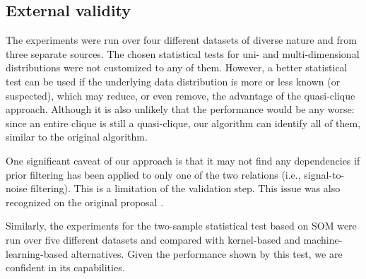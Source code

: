 \subsection{External validity}
The \PresQ experiments were run over four different datasets of
diverse nature and from three separate sources. The chosen statistical tests for
uni- and multi-dimensional distributions were not customized to any of them.
However, a better statistical test can be used if the underlying data distribution is more or
less known (or suspected), which may reduce, or even remove, the advantage of the
quasi-clique approach. Although it is also unlikely that the performance would be any worse:
since an entire clique is still a quasi-clique, our algorithm can identify all of them,
similar to the original \Find algorithm.

One significant caveat of our approach is that it may not find
any dependencies if prior filtering has been applied to only one of the two relations
(i.e., signal-to-noise filtering). This is a limitation of the validation
step. This issue was also recognized on the original \Find proposal \cite{koeller2003discovery}.

\medskip

Similarly, the experiments for the two-sample statistical test based on \gls{SOM}
were run over five different datasets and compared with kernel-based and machine-learning-based
alternatives. Given the performance shown by this test, we are confident in
its capabilities.
